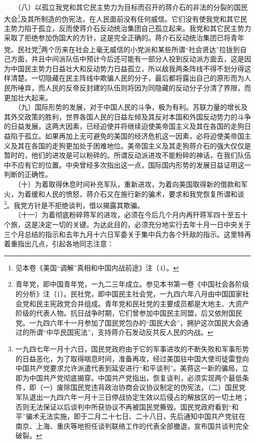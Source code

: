 \documentclass[cn,11pt,chinese]{elegantbook}
\begin{document}
　　（八）以孤立我党和其它民主势力为目标而召开的蒋介石的非法的分裂的国民大会\footnote[6]{ 见本卷《美国“调解”真相和中国内战前途》注〔4〕。}及其所制造的伪宪法，在人民面前没有任何威信。它们没有使我党和其它民主势力陷于孤立，反而使蒋介石反动统治集团自己孤立起来。我党和其它民主势力采取了拒绝参加伪国大的方针，这是完全正确的。蒋介石反动统治集团已将青年党、民社党\footnote[7]{ 青年党，即中国青年党，一九二三年成立。参见本书第一卷《中国社会各阶级的分析》注〔1〕。民社党，即中国民主社会党，一九四六年八月由中国国家社会党和民主宪政党合并组成。青年党和民社党的主要成员都是大地主、大资产阶级的代表人物。抗日战争时期，它们曾参加中国民主同盟，后又依附国民党。一九四六年十一月参加了国民党包办的“国民大会”，拥护这次国民大会通过的所谓“中华民国宪法”，支持蒋介石发动反共反人民的内战。}两个历来在社会上毫无威信的小党派和某些所谓“社会贤达”拉拢到自己方面，并且中间派队伍中预计今后还可能有一部分人投到反动派方面去，这是因为中国民主势力日益壮大和反动势力日益孤立，所以敌我两条阵线不得不划分得这样清楚。一切隐藏在民主阵线中欺骗人民的分子，最后都将露出自己的原形而为人民所唾弃，而人民的反帝反封建的队伍则将因为同隐藏的反动分子分清了界限，而更加壮大起来。\\
　　（九）国际形势的发展，对于中国人民的斗争，极为有利。苏联力量的增长及其外交政策的胜利，世界各国人民的日益左倾及其反对本国和外国反动势力的斗争的日益发展，这两大因素，已经迫使并将继续迫使美帝国主义及其在各国的走狗日益陷于孤立。如果再加上无可避免的美国的经济危机这一因素，必将迫使美帝国主义及其在各国的走狗更加处于困难地位。美帝国主义及其走狗蒋介石的强大仅仅是暂时的，他们的进攻是可以粉碎的。所谓反动派进攻不能粉碎的神话，在我们队伍中不应有它的位置。中央曾经多次指出这一点，国际国内形势的发展日益证明这一判断的正确性。\\
　　（十）为着取得休息时间补充军队，重新进攻，为着向美国取得新的借款和军火，为着缓和人民的愤怒，蒋介石又在施行新的骗术，要求和我党恢复所谓和谈\footnote[8]{ 一九四七年一月十六日，国民党政府由于它的军事进攻的不断失败和军事形势的日益恶化，为了取得喘息时间，准备再攻，经过美国驻中国大使司徒雷登向中国共产党要求允许派遣代表到延安进行“和平谈判”。美蒋这一新的骗局，立即为中国共产党彻底揭穿。中国共产党指出，恢复谈判，必须实现两个最低条件，即（一）废除国民党违背政治协商会议协议制定的伪宪法，（二）国民党军队退出一九四六年一月十三日停战协定生效以后侵占的解放区的一切土地；否则无法保证以后谈判中所获协议不再被国民党撕毁。国民党政府看到“和平”骗术无法实施，即于二月二十七日、二十八日，先后通知中国共产党驻在南京、上海、重庆等地担任谈判联络工作的代表全部撤退，宣布国共谈判完全破裂。}。我党方针是不拒绝谈判，借以揭露其欺骗。\\
　　（十一）为着彻底粉碎蒋军的进攻，必须在今后几个月内再歼蒋军四十至五十个旅，这是决定一切的关键。为达此目的，必须充分地实行去年十月一日中央关于三个月总结的指示和去年九月十六日军委关于集中兵力各个歼敌的指示。这里特再着重指出几点，引起各地同志注意：\\
\end{document}
